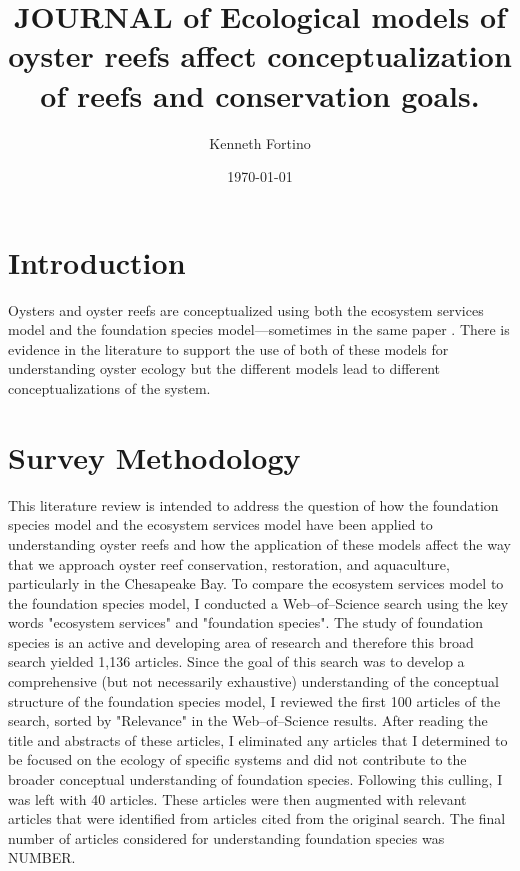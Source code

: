 \documentclass{article}
\begin{document}
\title{JOURNAL of Ecological models of oyster reefs affect conceptualization of reefs and conservation goals.}
\author{Kenneth Fortino}
\date{\today}

\maketitle

\section*{Introduction}
\label{sec:intro}

Oysters and oyster reefs are conceptualized using both the ecosystem services model and the foundation species model---sometimes in the same paper \cite{mercaldo-allen_oyster_2023}. There is evidence in the literature to support the use of both of these models for understanding oyster ecology but the different models lead to different conceptualizations of the system. 

\section*{Survey Methodology}
\label{sec:surv_method}

This literature review is intended to address the question of how the foundation species model and the ecosystem services model have been applied to understanding oyster reefs and how the application of these models affect the way that we approach oyster reef conservation, restoration, and aquaculture, particularly in the Chesapeake Bay. To compare the ecosystem services model to the foundation species model, I conducted a Web--of--Science search using the key words "ecosystem services" and "foundation species". The study of foundation species is an active and developing area of research and therefore this broad search yielded 1,136 articles. Since the goal of this search was to develop a comprehensive (but not necessarily exhaustive) understanding of the conceptual structure of the foundation species model, I reviewed the first 100 articles of the search, sorted by "Relevance" in the Web--of--Science results. After reading the title and abstracts of these articles, I eliminated any articles that I determined to be focused on the ecology of specific systems and did not contribute to the broader conceptual understanding of foundation species. Following this culling, I was left with 40 articles. These articles were then augmented with relevant articles that were identified from articles cited from the original search. The final number of articles considered for understanding foundation species was NUMBER.
\end{document}
